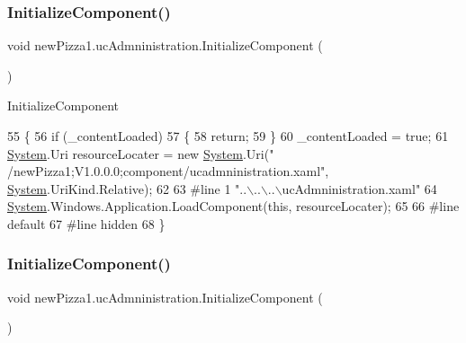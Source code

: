 \subsubsection{\texorpdfstring{Initialize\+Component()}{InitializeComponent()}\hspace{0.1cm}{\footnotesize\ttfamily [1/5]}}
{\footnotesize\ttfamily void new\+Pizza1.\+uc\+Admninistration.\+Initialize\+Component (\begin{DoxyParamCaption}{ }\end{DoxyParamCaption})\hspace{0.3cm}{\ttfamily [inline]}}



Initialize\+Component 


\begin{DoxyCode}
55         \{
56             \textcolor{keywordflow}{if} (\_contentLoaded)
57             \{
58                 \textcolor{keywordflow}{return};
59             \}
60             \_contentLoaded = \textcolor{keyword}{true};
61             \hyperlink{namespaceSystem}{System}.Uri resourceLocater = \textcolor{keyword}{new} \hyperlink{namespaceSystem}{System}.Uri(\textcolor{stringliteral}{"
      /newPizza1;V1.0.0.0;component/ucadmninistration.xaml"}, \hyperlink{namespaceSystem}{System}.UriKind.Relative);
62 
63 \textcolor{preprocessor}{#line 1 "..\(\backslash\)..\(\backslash\)..\(\backslash\)ucAdmninistration.xaml"}
64             \hyperlink{namespaceSystem}{System}.Windows.Application.LoadComponent(\textcolor{keyword}{this}, resourceLocater);
65 
66 \textcolor{preprocessor}{#line default}
67 \textcolor{preprocessor}{#line hidden}
68         \}
\end{DoxyCode}
\mbox{\label{classnewPizza1_1_1ucAdmninistration_a500966f5d66cf50194a823a88df8517e}} 
\subsubsection{\texorpdfstring{Initialize\+Component()}{InitializeComponent()}\hspace{0.1cm}{\footnotesize\ttfamily [2/5]}}
{\footnotesize\ttfamily void new\+Pizza1.\+uc\+Admninistration.\+Initialize\+Component (\begin{DoxyParamCaption}{ }\end{DoxyParamCaption})\hspace{0.3cm}{\ttfamily [inline]}}



